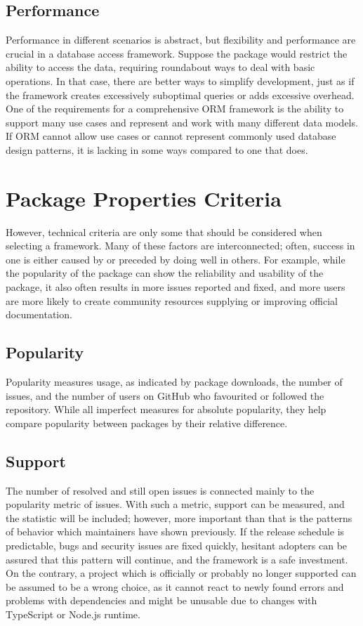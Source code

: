 \subsection{Performance}

Performance in different scenarios is abstract, but flexibility and performance
are crucial in a database access framework. Suppose the package would restrict
the ability to access the data, requiring roundabout ways to deal with basic
operations. In that case, there are better ways to simplify development, just as
if the framework creates excessively suboptimal queries or adds excessive
overhead. One of the requirements for a comprehensive ORM framework is the
ability to support many use cases and represent and work with many different
data models. If ORM cannot allow use cases or cannot represent commonly used
database design patterns, it is lacking in some ways compared to one that does.

\section{Package Properties Criteria}

However, technical criteria are only some that should be considered when
selecting a framework. Many of these factors are interconnected; often, success
in one is either caused by or preceded by doing well in others. For example,
while the popularity of the package can show the reliability and usability of
the package, it also often results in more issues reported and fixed, and more
users are more likely to create community resources supplying or improving
official documentation.

\subsection{Popularity}

Popularity measures usage, as indicated by package downloads, the number of
issues, and the number of users on GitHub who favourited or followed the
repository. While all imperfect measures for absolute popularity, they help
compare popularity between packages by their relative difference.

\subsection{Support}

The number of resolved and still open issues is connected mainly to the
popularity metric of issues. With such a metric, support can be measured, and
the statistic will be included; however, more important than that is the
patterns of behavior which maintainers have shown previously. If the release
schedule is predictable, bugs and security issues are fixed quickly, hesitant
adopters can be assured that this pattern will continue, and the framework is a
safe investment. On the contrary, a project which is officially or probably no
longer supported can be assumed to be a wrong choice, as it cannot react to
newly found errors and problems with dependencies and might be unusable due to
changes with TypeScript or Node.js runtime.


